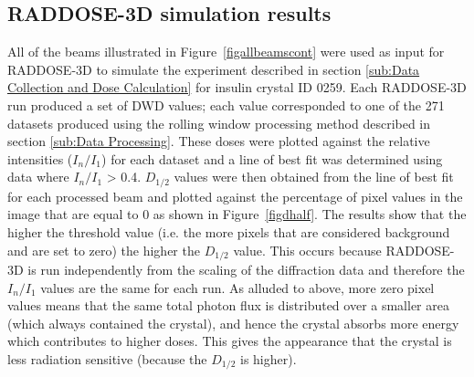 \subsection{RADDOSE-3D simulation results}
All of the beams illustrated in Figure~\ref{figallbeamscont} were used as input for RADDOSE-3D to simulate the experiment described in section \ref{sub:Data Collection and Dose Calculation} for insulin crystal ID 0259.
Each RADDOSE-3D run produced a set of DWD values; each value corresponded to one of the 271 datasets produced using the rolling window processing method described in section \ref{sub:Data Processing}.
These doses were plotted against the relative intensities ($I_n / I_1$) for each dataset and a line of best fit was determined using data where $I_n / I_1$ > 0.4.
$D_{1/2}$ values were then obtained from the line of best fit for each processed beam and plotted against the percentage of pixel values in the image that are equal to 0 as shown in Figure~\ref{figdhalf}.
The results show that the higher the threshold value (i.e. the more pixels that are considered background and are set to zero) the higher the $D_{1/2}$ value.
This occurs because RADDOSE-3D is run independently from the scaling of the diffraction data and therefore the $I_n/I_1$ values are the same for each run.
As alluded to above, more zero pixel values means that the same total photon flux is distributed over a smaller area (which always contained the crystal), and hence the crystal absorbs more energy which contributes to higher doses.
This gives the appearance that the crystal is less radiation sensitive (because the $D_{1/2}$ is higher).


